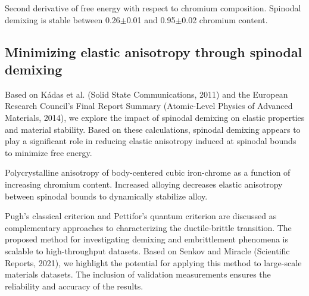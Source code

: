 Second derivative of free energy with respect to chromium composition. Spinodal demixing is stable between 0.26$\pm$0.01 and 0.95$\pm$0.02 chromium content. \cite{korzhavyi2009electronic,trochet2021influence,levesque2011simple, binder2001spinodal}


\subsection{Minimizing elastic anisotropy through spinodal demixing}
Based on Kádas et al. (Solid State Communications, 2011) and the European Research Council's Final Report Summary (Atomic-Level Physics of Advanced Materials, 2014), we explore the impact of spinodal demixing on elastic properties and material stability. Based on these calculations, spinodal demixing appears to play a significant role in reducing elastic anisotropy induced at spinodal bounds to minimize free energy. 

Polycrystalline anisotropy of body-centered cubic iron-chrome as a function of increasing chromium content. Increased alloying decreases elastic anisotropy between spinodal bounds to dynamically stabilize alloy. \cite{kadas2011thermo,euroresearchcouncil2014}

Pugh's classical criterion and Pettifor's quantum criterion are discussed as complementary approaches to characterizing the ductile-brittle transition. The proposed method for investigating demixing and embrittlement phenomena is scalable to high-throughput datasets. Based on Senkov and Miracle (Scientific Reports, 2021), we highlight the potential for applying this method to large-scale materials datasets. The inclusion of validation measurements ensures the reliability and accuracy of the results.


